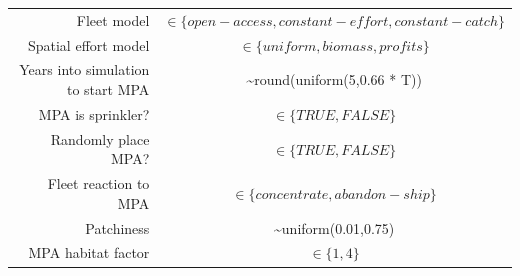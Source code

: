 \documentclass[]{article}
\begin{document}
\begin{longtable}[]{@{}rc@{}}
\begin{minipage}[t]{0.41\columnwidth}
Fleet model\strut
\end{minipage} & \begin{minipage}[t]{0.53\columnwidth}\centering
\(\in\{open-access, constant-effort,constant-catch\}\)\strut
\end{minipage}\tabularnewline
\begin{minipage}[t]{0.41\columnwidth}\raggedleft
Spatial effort model\strut
\end{minipage} & \begin{minipage}[t]{0.53\columnwidth}\centering
\(\in\{uniform, biomass,profits\}\)\strut
\end{minipage}\tabularnewline
\begin{minipage}[t]{0.41\columnwidth}\raggedleft
Years into simulation to start MPA\strut
\end{minipage} & \begin{minipage}[t]{0.53\columnwidth}\centering
\textasciitilde{}round(uniform(5,0.66 * T))\strut
\end{minipage}\tabularnewline
\begin{minipage}[t]{0.41\columnwidth}\raggedleft
MPA is sprinkler?\strut
\end{minipage} & \begin{minipage}[t]{0.53\columnwidth}\centering
\(\in\{TRUE,FALSE\}\)\strut
\end{minipage}\tabularnewline
\begin{minipage}[t]{0.41\columnwidth}\raggedleft
Randomly place MPA?\strut
\end{minipage} & \begin{minipage}[t]{0.53\columnwidth}\centering
\(\in\{TRUE,FALSE\}\)\strut
\end{minipage}\tabularnewline
\begin{minipage}[t]{0.41\columnwidth}\raggedleft
Fleet reaction to MPA\strut
\end{minipage} & \begin{minipage}[t]{0.53\columnwidth}\centering
\(\in\{concentrate, abandon-ship\}\)\strut
\end{minipage}\tabularnewline
\begin{minipage}[t]{0.41\columnwidth}\raggedleft
Patchiness\strut
\end{minipage} & \begin{minipage}[t]{0.53\columnwidth}\centering
\textasciitilde{}uniform(0.01,0.75)\strut
\end{minipage}\tabularnewline
\begin{minipage}[t]{0.41\columnwidth}\raggedleft
MPA habitat factor\strut
\end{minipage} & \begin{minipage}[t]{0.53\columnwidth}\centering
\(\in\{1, 4\}\)\strut
\end{minipage}\tabularnewline
\bottomrule
\end{longtable}
\end{document}
